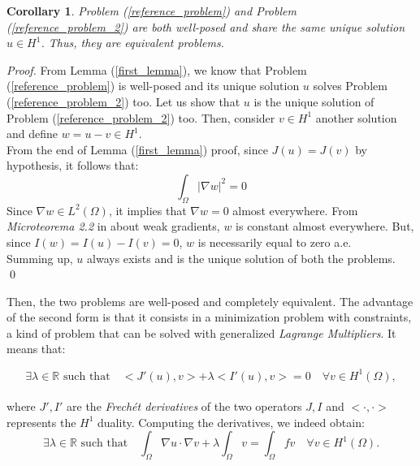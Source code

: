 \documentclass[a4paper,11pt]{article}
\newtheorem{corollary}{Corollary}
\begin{document}
\begin{corollary}
	Problem (\ref{reference_problem}) and Problem (\ref{reference_problem_2}) are both well-posed and share the same unique solution $u \in H^1$. Thus, they are equivalent problems.
\end{corollary}
\begin{proof}
	From Lemma (\ref{first_lemma}), we know that Problem (\ref{reference_problem}) is well-posed and its unique solution $u$ solves Problem (\ref{reference_problem_2}) too. Let us show that $u$ is the unique solution of Problem (\ref{reference_problem_2}) too. Then, consider $v \in H^1$ another solution and define $w=u-v \in H^1$. \\
	From the end of Lemma (\ref{first_lemma}) proof, since $J(u)=J(v)$ by hypothesis, it follows that:
	\begin{equation*}
	\int_{\Omega} | \nabla w | ^2 = 0
	\end{equation*}
	Since $\nabla w \in L^2(\Omega)$, it implies that $\nabla w = 0$ almost everywhere. From \emph{Microteorema 2.2} in \cite{salsa} about weak gradients, $w$ is constant almost everywhere. But, since $I(w)=I(u)-I(v)=0$, $w$ is necessarily equal to zero a.e. \\
	Summing up, $u$ always exists and is the unique solution of both the problems. \\ \qed
\end{proof} \vspace{4mm} 
\noindent Then, the two problems are well-posed and completely equivalent. The advantage of the second form is that it consists in a minimization problem with constraints, a kind of problem that can be solved with generalized \emph{Lagrange Multipliers}. It means that:

\begin{equation*}
\exists \lambda \in \mathbb{R} \text{ such that} \quad <J'(u),v>+\lambda <I'(u),v>=0 \quad \forall v \in H^1(\Omega),
\end{equation*}\\
\noindent where $J',I'$ are the \emph{Frechét derivatives} of the two operators $J,I$ and $<\cdot,\cdot>$ represents the $H^1$ duality. Computing the derivatives, we indeed obtain:
\begin{equation*}
\exists \lambda \in \mathbb{R} \text{ such that} \quad \int_{\Omega}\nabla u \cdot \nabla v + \lambda \int_\Omega v = \int_{\Omega} fv \quad \forall v \in H^1(\Omega).
\end{equation*}\\
\end{document}
